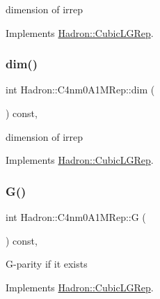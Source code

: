 dimension of irrep 

Implements \mbox{\hyperlink{structHadron_1_1CubicLGRep_a3acbaea26503ed64f20df693a48e4cdd}{Hadron\+::\+Cubic\+L\+G\+Rep}}.

\mbox{\label{structHadron_1_1C4nm0A1MRep_ae62b548a67faabb6850b1fc035815dc4}} 
\subsubsection{\texorpdfstring{dim()}{dim()}\hspace{0.1cm}{\footnotesize\ttfamily [3/3]}}
{\footnotesize\ttfamily int Hadron\+::\+C4nm0\+A1\+M\+Rep\+::dim (\begin{DoxyParamCaption}{ }\end{DoxyParamCaption}) const\hspace{0.3cm}{\ttfamily [inline]}, {\ttfamily [virtual]}}

dimension of irrep 

Implements \mbox{\hyperlink{structHadron_1_1CubicLGRep_a3acbaea26503ed64f20df693a48e4cdd}{Hadron\+::\+Cubic\+L\+G\+Rep}}.

\mbox{\label{structHadron_1_1C4nm0A1MRep_a4b8cedc0bf2a2c77a259d33915be1ab9}} 
\subsubsection{\texorpdfstring{G()}{G()}\hspace{0.1cm}{\footnotesize\ttfamily [1/3]}}
{\footnotesize\ttfamily int Hadron\+::\+C4nm0\+A1\+M\+Rep\+::G (\begin{DoxyParamCaption}{ }\end{DoxyParamCaption}) const\hspace{0.3cm}{\ttfamily [inline]}, {\ttfamily [virtual]}}

G-\/parity if it exists 

Implements \mbox{\hyperlink{structHadron_1_1CubicLGRep_ace26f7b2d55e3a668a14cb9026da5231}{Hadron\+::\+Cubic\+L\+G\+Rep}}.

\mbox{\label{structHadron_1_1C4nm0A1MRep_a4b8cedc0bf2a2c77a259d33915be1ab9}} 

